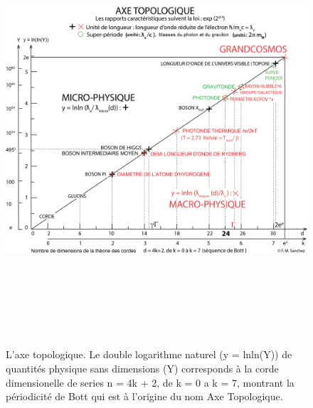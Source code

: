 \documentclass[a4paper,12pt]{article}
\begin{document}
\begin{appendix}
\begin{figure}
\centering
\includegraphics[width=15cm,height=16cm]{./figures/figure.png}
\caption[Axe Topologique]{L'axe topologique. Le double logarithme naturel (y = lnln(Y)) de quantités physique sans dimensions (Y) corresponds à la corde dimensionelle de series n = 4k + 2, de k = 0 a k = 7, montrant la périodicité de Bott qui est à l'origine du nom Axe Topologique.}
\label{fig:2:figure2}
\end{figure}


\end{appendix}
\end{document}
